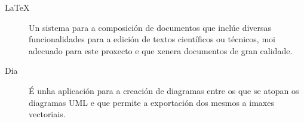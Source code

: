   \begin{description}
  \item [LaTeX] Un sistema para a composición de documentos que inclúe
    diversas funcionalidades para a edición de textos científicos
    ou técnicos, moi adecuado para este proxecto e que xenera
    documentos de gran calidade.%
   \item [Dia] É unha aplicación para a creación de diagramas entre os que se atopan os
diagramas UML e que permite a exportación dos mesmos a imaxes vectoriais.
  \end{description}



